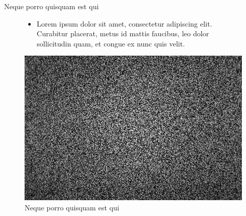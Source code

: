 \documentclass[UKenglish, aspectratio = 169]{beamer}
\begin{document}
\begin{frame}{Neque porro quisquam est qui }
		\begin{figure}
			\vspace{0.5cm}
			\begin{itemize}
					\item Lorem ipsum dolor sit amet, consectetur adipiscing elit. Curabitur placerat, metus id mattis faucibus, leo dolor sollicitudin quam, et congue ex nunc quis velit.
				\end{itemize}
			\centering
			\vspace{0.2cm}
			\includegraphics{figs/stock photo.jpg}
			\caption{\tiny{Neque porro quisquam est qui }}
		\end{figure}
\end{frame}
\end{document}

